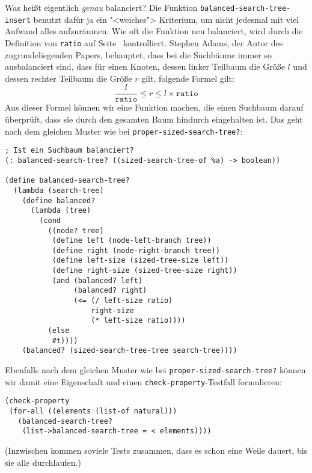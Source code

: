 Was heißt eigentlich \emph{genau} balanciert?  Die Funktion
\lstinline{balanced-search-tree-insert} benutzt dafür ja ein
"<weiches"> Kriterium, um nicht jedesmal mit viel Aufwand alles
aufzuräumen.  Wie oft die Funktion neu balanciert, wird durch die
Definition von \lstinline{ratio} auf Seite~\pageref{def:ratio}
kontrolliert.  Stephen Adams, der Autor des zugrundeliegenden Papers,
behauptet, dass bei die Suchbäume immer so ausbalanciert sind, dass
für einen Knoten, dessen linker Teilbaum die Größe $l$
und dessen rechter Teilbaum die Größe $r$ gilt, folgende Formel gilt:
%
\begin{displaymath}
  \frac{l}{\mathtt{ratio}} \leq r \leq l \times \mathtt{ratio}
\end{displaymath}
%
Aus dieser Formel können wir eine Funktion machen, die einen Suchbaum
darauf überprüft, dass sie durch den gesamten Baum hindurch
eingehalten ist.  Das geht nach dem gleichen Muster wie bei
\lstinline{proper-sized-search-tree?}:
%
\begin{lstlisting}
; Ist ein Suchbaum balanciert?
(: balanced-search-tree? ((sized-search-tree-of %a) -> boolean))

(define balanced-search-tree?
  (lambda (search-tree)
    (define balanced?
      (lambda (tree)
        (cond
          ((node? tree)
           (define left (node-left-branch tree))
           (define right (node-right-branch tree)) 
           (define left-size (sized-tree-size left))
           (define right-size (sized-tree-size right))
           (and (balanced? left)
                (balanced? right)
                (<= (/ left-size ratio)
                    right-size
                    (* left-size ratio))))
          (else
           #t))))
    (balanced? (sized-search-tree-tree search-tree))))
\end{lstlisting}
%
Ebenfalls nach dem gleichen Muster wie bei
\lstinline{proper-sized-search-tree?} können wir damit eine
Eigenschaft und einen \lstinline{check-property}-Testfall formulieren:
%
\begin{lstlisting}
(check-property
 (for-all ((elements (list-of natural)))
   (balanced-search-tree?
    (list->balanced-search-tree = < elements))))
\end{lstlisting}
%
(Inzwischen kommen soviele Tests zusammen, dass es schon eine Weile
dauert, bis sie alle durchlaufen.)

